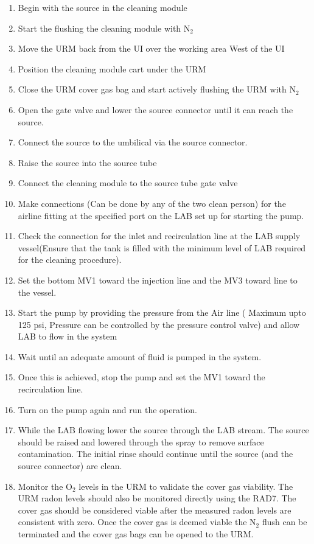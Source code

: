 \begin{enumerate}
\item Begin with the source in the cleaning module
\item Start the flushing the cleaning module with N$_{2}$ 
\item Move the URM back from the UI over the working area West of the UI
\item Position the cleaning module cart under the URM
\item Close the URM cover gas bag and start actively flushing the URM with N$_{2}$
\item Open the gate valve and lower the source connector until it can reach the source.
\item Connect the source to the umbilical via the source connector. 
\item Raise the source into the source tube
\item Connect the cleaning module to the source tube gate valve
\item Make connections (Can be done by any of the two clean person) for the  airline fitting at the specified port on the  LAB set up for starting the pump.
\item Check the connection for the inlet and recirculation line at the LAB supply vessel(Ensure that the tank is filled with the minimum level of LAB required for the cleaning procedure).
\item Set the bottom MV1  toward the injection line and the MV3 toward  line to the vessel.
\item Start the pump by providing the pressure from the Air line ( Maximum upto 125 psi, Pressure can be controlled by the pressure control valve) and allow LAB to flow in the system
\item Wait until an adequate amount of fluid is pumped in the system. 
\item Once this is achieved, stop the pump and set the MV1 toward the recirculation  line.
\item Turn on the pump again and run the operation.
\item While the LAB flowing  lower the source through the LAB stream. The source should be  raised and lowered through the spray to remove surface contamination. The initial rinse should continue until the source (and the source connector) are clean.
\item Monitor the O$_2$ levels in the URM to validate the cover gas viability. The URM radon levels should also be monitored directly using the RAD7. The cover gas should be considered viable after the measured radon levels are consistent with zero. Once the cover gas is deemed viable the N$_{2}$ flush can be terminated and the cover gas bags can be opened to the URM. 

\end{enumerate}
